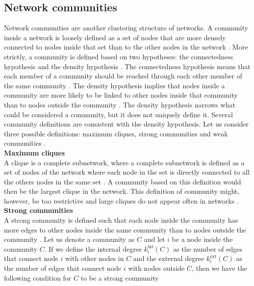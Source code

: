 \documentclass[11 pt , letterpaper , twoside , openright]{book}
\begin{document}
\subsection{Network communities}

Network communities are another clustering structure of networks. A community inside a network is loosely defined as a set of nodes that are more densely connected to nodes inside that set than to the other nodes in the network \cite{Saha2015}. More strictly, a community is defined based on two hypotheses: the connectedness hypothesis and the density hypothesis \cite{Albert2016}. The connectedness hypothesis means that each member of a community should be reached through each other member of the same community \cite{Albert2016}. The density hypothesis implies that nodes inside a community are more likely to be linked to other nodes inside that community than to nodes outside the community \cite{Albert2016}. The density hypothesis narrows what could be considered a community, but it does not uniquely define it. Several community definitions are consistent with the density hypothesis. Let us consider three possible definitions: maximum cliques, strong communities and weak communities \cite{Albert2016}.\\
\newline
\textbf{Maximum cliques}\\
\newline
A clique is a complete subnetwork, where a complete subnetwork is defined as a set of nodes of the network where each node in the set is directly connected to all the others nodes in the same set \cite{Albert2016}. A community based on this definition would then be the largest clique in the network. This definition of community might, however, be too restrictive and large cliques do not appear often in networks \cite{Albert2016}.\\   
\newpage
\noindent
\textbf{Strong communities}\\
\newline
A strong community is defined such that each node inside the community has more edges to other nodes inside the same community than to nodes outside the community \cite{Albert2016}\cite{F.Costa2007}. Let us denote a community as $C$ and let $i$ be a node inside the community $C$. If we define the internal degree $k_i^{\textrm{int}}(C)$ as the number of edges that connect node $i$ with other nodes in $C$ and the external degree $k_i^{\textrm{ext}}(C)$ as the number of edges that connect node $i$ with nodes outside $C$, then we have the following condition for $C$ to be a strong community \cite{Albert2016}
\end{document}
